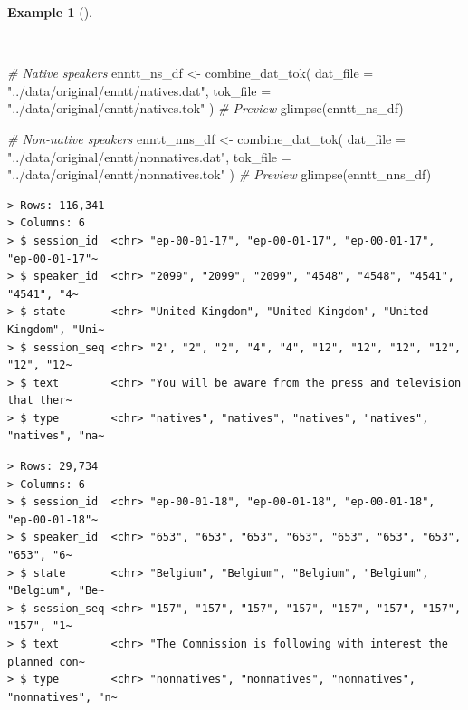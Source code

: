 \documentclass[
  letterpaper,
  DIV=11,
  numbers=noendperiod]{scrreprt}
\newenvironment{Shaded}{\begin{snugshade}}{\end{snugshade}}
\newcommand{\AttributeTok}[1]{\textcolor[rgb]{0.00,0.00,0.00}{#1}}
\newcommand{\CommentTok}[1]{\textcolor[rgb]{0.00,0.00,0.00}{\textit{#1}}}
\newcommand{\FunctionTok}[1]{\textcolor[rgb]{0.00,0.00,0.00}{#1}}
\newcommand{\NormalTok}[1]{\textcolor[rgb]{0.00,0.00,0.00}{#1}}
\newcommand{\OtherTok}[1]{\textcolor[rgb]{0.00,0.00,0.00}{#1}}
\newcommand{\StringTok}[1]{\textcolor[rgb]{0.00,0.00,0.00}{#1}}
\theoremstyle{definition}
\newtheorem{example}{Example}[chapter]
\theoremstyle{remark}
\begin{document}
\begin{example}[]\protect\hypertarget{exm-cd-enntt-combine-dat-tok}{}\label{exm-cd-enntt-combine-dat-tok}

~

\begin{Shaded}
\begin{Highlighting}[]
\CommentTok{\# Native speakers}
\NormalTok{enntt\_ns\_df }\OtherTok{\textless{}{-}}
  \FunctionTok{combine\_dat\_tok}\NormalTok{(}
    \AttributeTok{dat\_file =} \StringTok{"../data/original/enntt/natives.dat"}\NormalTok{,}
    \AttributeTok{tok\_file =} \StringTok{"../data/original/enntt/natives.tok"}
\NormalTok{  )}
\CommentTok{\# Preview}
\FunctionTok{glimpse}\NormalTok{(enntt\_ns\_df)}

\CommentTok{\# Non{-}native speakers}
\NormalTok{enntt\_nns\_df }\OtherTok{\textless{}{-}}
  \FunctionTok{combine\_dat\_tok}\NormalTok{(}
    \AttributeTok{dat\_file =} \StringTok{"../data/original/enntt/nonnatives.dat"}\NormalTok{,}
    \AttributeTok{tok\_file =} \StringTok{"../data/original/enntt/nonnatives.tok"}
\NormalTok{  )}
\CommentTok{\# Preview}
\FunctionTok{glimpse}\NormalTok{(enntt\_nns\_df)}
\end{Highlighting}
\end{Shaded}

\begin{verbatim}
> Rows: 116,341
> Columns: 6
> $ session_id  <chr> "ep-00-01-17", "ep-00-01-17", "ep-00-01-17", "ep-00-01-17"~
> $ speaker_id  <chr> "2099", "2099", "2099", "4548", "4548", "4541", "4541", "4~
> $ state       <chr> "United Kingdom", "United Kingdom", "United Kingdom", "Uni~
> $ session_seq <chr> "2", "2", "2", "4", "4", "12", "12", "12", "12", "12", "12~
> $ text        <chr> "You will be aware from the press and television that ther~
> $ type        <chr> "natives", "natives", "natives", "natives", "natives", "na~
\end{verbatim}

\begin{verbatim}
> Rows: 29,734
> Columns: 6
> $ session_id  <chr> "ep-00-01-18", "ep-00-01-18", "ep-00-01-18", "ep-00-01-18"~
> $ speaker_id  <chr> "653", "653", "653", "653", "653", "653", "653", "653", "6~
> $ state       <chr> "Belgium", "Belgium", "Belgium", "Belgium", "Belgium", "Be~
> $ session_seq <chr> "157", "157", "157", "157", "157", "157", "157", "157", "1~
> $ text        <chr> "The Commission is following with interest the planned con~
> $ type        <chr> "nonnatives", "nonnatives", "nonnatives", "nonnatives", "n~
\end{verbatim}

\end{example}
\end{document}
